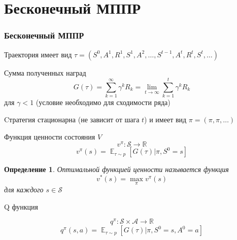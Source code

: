 \documentclass[notheorems]{beamer} %
\newtheorem{definition}{Определение}
\begin{document}
\section{Бесконечный МППР}
\begin{frame}
	\frametitle{Бесконечный МППР}
	Траектория  имеет вид
	$\tau = (S^0, A^1, R^1, S^1, A^2, \dots, S^{t-1}, A^{t}, R^{t}, S^t, \dots)$
	
	Сумма полученных наград 
	  $$G(\tau) =  \sum_{k=1}^{\infty}\gamma^kR_k = \lim_{t \to \infty} \sum_{k=1}^{t}\gamma^kR_k $$
	  для $\gamma < 1$ (условие необходимо для сходимости ряда)
	  
	 Cтратегия стационарна (не зависит от шага $t$) и имеет вид $\pi = (\pi, \pi, \dots)$

	  	
	  	\begin{alertblock}{Функция ценности состояния $V$}
	  		$$v^\pi: \mathcal{S} \to \mathbb{R}$$
	  		$$ v^\pi(s) = \mathop{\mathbb{E}}_{\tau \sim p}[G(\tau)|\pi,S^0=s] $$
	  	\end{alertblock}
\end{frame}
\begin{frame}
	\begin{definition}
		Оптимальной функцией ценности называется функция $$ v^*(s)= \max_\pi v^\pi(s)$$ для каждого $s \in  \mathcal{S}$
	\end{definition}

	\begin{block}{Q функция}
	
		$$q^\pi: \mathcal{S} \times  \mathcal{A}  \to \mathbb{R}$$
		$$ q^\pi(s,a) = \mathop{\mathbb{E}}_{\tau \sim p}[G(\tau)|\pi,S^0=s,A^0=a] $$
	\end{block}
\end{frame}
\end{document}
